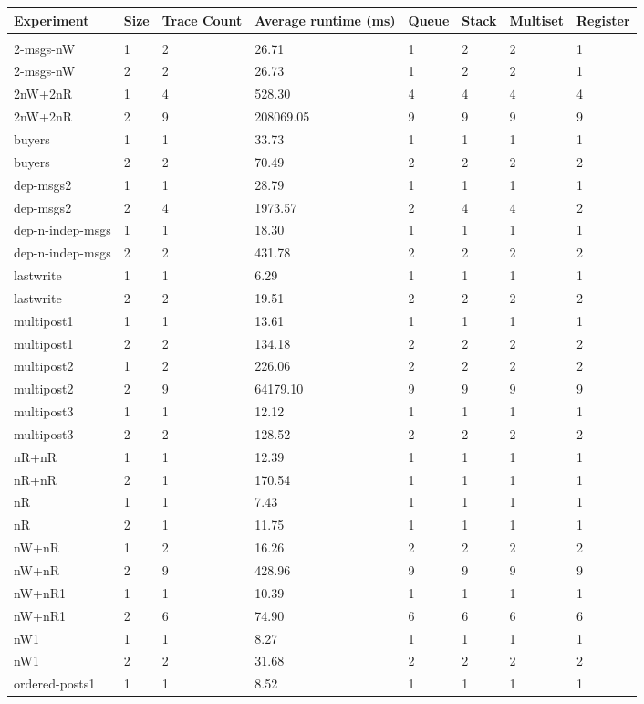 \documentclass{standalone}
\begin{document}
\begin{tabular}{l l l | l | l l l l}
Experiment & Size & Trace Count & Average runtime (ms)& Queue & Stack & Multiset & Register\\\hline\\
2-msgs-nW & 1 & 2 & 26.71 & 1 & 2 & 2 & 1\\
2-msgs-nW & 2 & 2 & 26.73 & 1 & 2 & 2 & 1\\
2nW+2nR & 1 & 4 & 528.30 & 4 & 4 & 4 & 4\\
2nW+2nR & 2 & 9 & 208069.05 & 9 & 9 & 9 & 9\\
buyers & 1 & 1 & 33.73 & 1 & 1 & 1 & 1\\
buyers & 2 & 2 & 70.49 & 2 & 2 & 2 & 2\\
dep-msgs2 & 1 & 1 & 28.79 & 1 & 1 & 1 & 1\\
dep-msgs2 & 2 & 4 & 1973.57 & 2 & 4 & 4 & 2\\
dep-n-indep-msgs & 1 & 1 & 18.30 & 1 & 1 & 1 & 1\\
dep-n-indep-msgs & 2 & 2 & 431.78 & 2 & 2 & 2 & 2\\
lastwrite & 1 & 1 & 6.29 & 1 & 1 & 1 & 1\\
lastwrite & 2 & 2 & 19.51 & 2 & 2 & 2 & 2\\
multipost1 & 1 & 1 & 13.61 & 1 & 1 & 1 & 1\\
multipost1 & 2 & 2 & 134.18 & 2 & 2 & 2 & 2\\
multipost2 & 1 & 2 & 226.06 & 2 & 2 & 2 & 2\\
multipost2 & 2 & 9 & 64179.10 & 9 & 9 & 9 & 9\\
multipost3 & 1 & 1 & 12.12 & 1 & 1 & 1 & 1\\
multipost3 & 2 & 2 & 128.52 & 2 & 2 & 2 & 2\\
nR+nR & 1 & 1 & 12.39 & 1 & 1 & 1 & 1\\
nR+nR & 2 & 1 & 170.54 & 1 & 1 & 1 & 1\\
nR & 1 & 1 & 7.43 & 1 & 1 & 1 & 1\\
nR & 2 & 1 & 11.75 & 1 & 1 & 1 & 1\\
nW+nR & 1 & 2 & 16.26 & 2 & 2 & 2 & 2\\
nW+nR & 2 & 9 & 428.96 & 9 & 9 & 9 & 9\\
nW+nR1 & 1 & 1 & 10.39 & 1 & 1 & 1 & 1\\
nW+nR1 & 2 & 6 & 74.90 & 6 & 6 & 6 & 6\\
nW1 & 1 & 1 & 8.27 & 1 & 1 & 1 & 1\\
nW1 & 2 & 2 & 31.68 & 2 & 2 & 2 & 2\\
ordered-posts1 & 1 & 1 & 8.52 & 1 & 1 & 1 & 1\\

\end{tabular}
\end{document}
